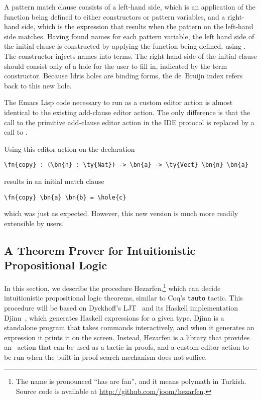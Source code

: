 A pattern match clause consists of a left-hand side, which is an
application of the function being defined to either constructors or
pattern variables, and a right-hand side, which is the expression that
results when the pattern on the left-hand side matches.  Having found
names for each pattern variable, the left hand side of the initial
clause is constructed by applying the function being defined, using
.  The  constructor injects names into terms.  The
right hand side of the initial clause should consist only of a hole
for the user to fill in, indicated by the  term constructor.
Because Idris holes are binding forms, the de~Bruijn index 
refers back to this new hole.


The Emacs Lisp code necessary to run  as a custom editor
action is almost identical to the existing add-clause editor
action.  The only difference is that the call to the primitive
add-clause editor action in the IDE protocol is replaced by a call to
.

Using this editor action on the declaration
\begin{Verbatim}
\fn{copy} : (\bn{n} : \ty{Nat}) -> \bn{a} -> \ty{Vect} \bn{n} \bn{a}
\end{Verbatim}
results in an initial match clause
\begin{Verbatim}
\fn{copy} \bn{a} \bn{b} = \hole{c}
\end{Verbatim}
which was just as expected. However, this new version is much more
readily extensible by users.

\subsection{A Theorem Prover for Intuitionistic Propositional Logic}\label{sec:hezarfen}

In this section, we describe the procedure Hezarfen,\footnote{The name is
  pronounced ``has are fan'', and it means
    polymath in Turkish. Source code is available at
    \url{http://github.com/joom/hezarfen}.} which can decide intuitionistic
propositional logic theorems, similar to Coq's \texttt{tauto} tactic.
This procedure will be based on Dyckhoff's LJT~\cite{ljt} and its Haskell
implementation Djinn~\cite{djinn}, which generates Haskell expressions
for a given type.
Djinn is a standalone program that takes commands
interactively, and when it generates an expression it prints it on the screen.
Instead, Hezarfen is a library that provides an \Elab\ action
that can be used as a tactic in proofs, and a custom editor action to be run
when the built-in proof search mechanism does not suffice.

